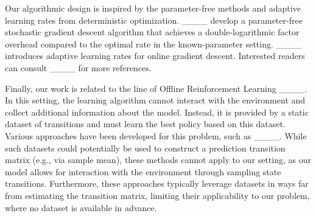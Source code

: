 

Our algorithmic design is inspired by the parameter-free methods and adaptive learning rates from deterministic optimization. ____ develop a parameter-free stochastic gradient descent algorithm that achieves a double-logarithmic factor overhead compared to the optimal rate in the known-parameter setting. ____ introduces adaptive learning rates for online gradient descent. Interested readers can consult ____ for more references.


Finally, our work is related to the line of Offline Reinforcement Learning ____. In this setting, the learning algorithm cannot interact with the environment and collect additional information about the model. Instead, it is provided by a static dataset of transitions and must learn the best policy based on this dataset. Various approaches have been developed for this problem, such as ____. While such datasets could potentially be used to construct a prediction transition matrix (e.g., via sample mean), these methods cannot apply to our setting, as our model allows for interaction with the environment through sampling state transitions. Furthermore, these approaches typically leverage datasets in ways far from estimating the transition matrix, limiting their applicability to our problem, where no dataset is available in advance.


